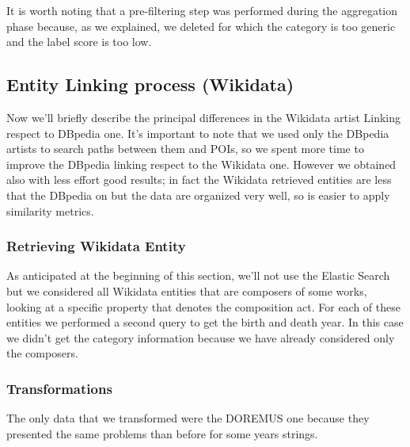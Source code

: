 \documentclass[paper=a4, fontsize=11pt]{scrartcl}
\begin{document}
It is worth noting that a pre-filtering step was performed during the aggregation phase because, as we explained, we deleted for which the category is too generic and the label score is too low.

\subsection{Entity Linking process (Wikidata)}

Now we'll briefly describe the principal differences in the Wikidata artist Linking respect to DBpedia one. It's important to note that we used only the DBpedia artists to search paths between them and POIs, so we spent more time to improve the DBpedia linking respect to the Wikidata one. However we obtained also with less effort good results; in fact the Wikidata retrieved entities are less that the DBpedia on but the data are organized very well, so is easier to apply similarity metrics.


\subsubsection{Retrieving Wikidata Entity}
As anticipated at the beginning of this section, we'll not use the Elastic Search but we considered all Wikidata entities that are composers of some works, looking at a specific property that denotes the composition act. For each of these entities we performed a second query to get the birth and death year. In this case we didn't get the category information because we have already considered only the composers.

\subsubsection{Transformations}
The only data that we transformed were the DOREMUS one because they presented the same problems than before for some years strings. 
\end{document}
